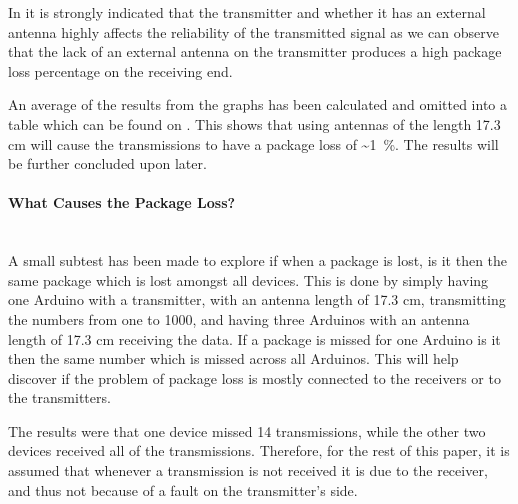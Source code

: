 \noindent%
In  it is strongly indicated that the transmitter and whether it has an external antenna highly affects the reliability of the transmitted signal as we can observe that the lack of an external antenna on the transmitter produces a high package loss percentage on the receiving end.

An average of the results from the graphs has been calculated and omitted into a table which can be found on . 
This shows that using antennas of the length 17.3 cm will cause the transmissions to have a package loss of \textasciitilde1~\%.
The results will be further concluded upon later.

\paragraph{What Causes the Package Loss?}\hfill \\
A small subtest has been made to explore if when a package is lost, is it then the same package which is lost amongst all devices.
This is done by simply having one Arduino with a transmitter, with an antenna length of 17.3 cm, transmitting the numbers from one to 1000, and having three Arduinos with an antenna length of 17.3 cm receiving the data. 
If a package is missed for one Arduino is it then the same number which is missed across all Arduinos.
This will help discover if the problem of package loss is mostly connected to the receivers or to the transmitters.

The results were that one device missed 14 transmissions, while the other two devices received all of the transmissions.
Therefore, for the rest of this paper, it is assumed that whenever a transmission is not received it is due to the receiver, and thus not because of a fault on the transmitter's side.


